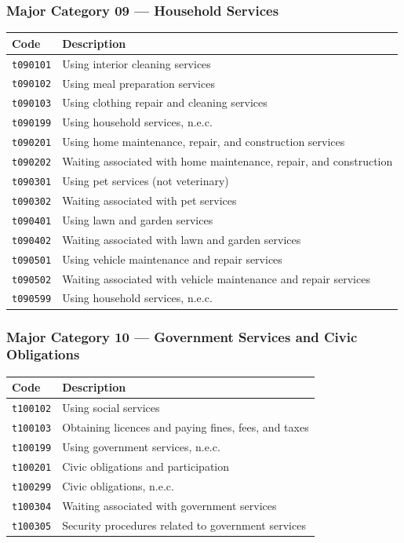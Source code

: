 \documentclass[11pt, a4paper]{article}
\begin{document}
\subsubsection*{Major Category 09 --- Household Services}
\begin{longtable}{L{3cm} L{13cm}}
\toprule \textbf{Code} & \textbf{Description} \\ \midrule \endhead
\bottomrule \endfoot
\texttt{t090101} & Using interior cleaning services \\
 \texttt{t090102} & Using meal preparation services \\
\texttt{t090103} & Using clothing repair and cleaning services \\
 \texttt{t090199} & Using household services, n.e.c. \\
\texttt{t090201} & Using home maintenance, repair, and construction services \\
 \texttt{t090202} & Waiting associated with home maintenance, repair, and construction \\
\texttt{t090301} & Using pet services (not veterinary) \\
 \texttt{t090302} & Waiting associated with pet services \\
\texttt{t090401} & Using lawn and garden services \\
 \texttt{t090402} & Waiting associated with lawn and garden services \\
\texttt{t090501} & Using vehicle maintenance and repair services \\
 \texttt{t090502} & Waiting associated with vehicle maintenance and repair services \\
\texttt{t090599} & Using household services, n.e.c. \\
\end{longtable}

\subsubsection*{Major Category 10 --- Government Services and Civic Obligations}
\begin{longtable}{L{3cm} L{13cm}}
\toprule \textbf{Code} & \textbf{Description} \\ \midrule \endhead
\bottomrule \endfoot
\texttt{t100102} & Using social services \\
 \texttt{t100103} & Obtaining licences and paying fines, fees, and taxes \\
\texttt{t100199} & Using government services, n.e.c. \\
 \texttt{t100201} & Civic obligations and participation \\
\texttt{t100299} & Civic obligations, n.e.c. \\
 \texttt{t100304} & Waiting associated with government services \\
\texttt{t100305} & Security procedures related to government services \\
\end{longtable}
\end{document}
